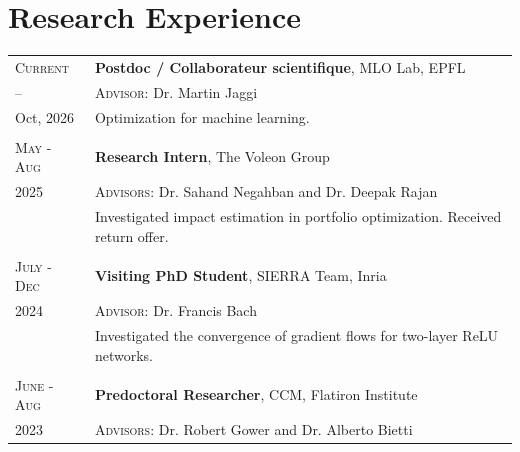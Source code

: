 \documentclass[10pt]{article}
\newcommand{\spacing}{\vspace{0.5cm}}
\begin{document}

\section{Research Experience}
\begin{longtable}
    {R{1.8cm}|L{11.8cm}}
    \textsc{Current}      & \textbf{Postdoc / Collaborateur scientifique}, MLO Lab, EPFL                   \\
    { -- \hspace{0.2cm} } & \textsc{Advisor:} Dr. Martin Jaggi                                             \\
    Oct, 2026             & {\small Optimization for machine learning.}
    \\
                                                                                       \\
    \textsc{May - Aug}    & \textbf{Research Intern}, The Voleon Group                                     \\
    2025                  & \textsc{Advisors:} Dr. Sahand Negahban and Dr. Deepak Rajan                    \\
                          & {\small Investigated impact estimation in portfolio
                                optimization. Received return offer.}
    \\
                                                                                       \\
    \textsc{July - Dec}   & \textbf{Visiting PhD Student}, SIERRA Team, Inria                              \\
    2024                  & \textsc{Advisor:}
    Dr.  Francis Bach                                                                                      \\
                          & {\small Investigated the convergence of gradient
                                flows for two-layer ReLU networks.}
    \\
                                                                                       \\
    \textsc{June - Aug}   & \textbf{Predoctoral Researcher}, CCM, Flatiron Institute                       \\
    2023                  & \textsc{Advisors:}
    Dr.
    Robert Gower and Dr.
    Alberto Bietti                                                                                         \\

\end{longtable}
\end{document}
